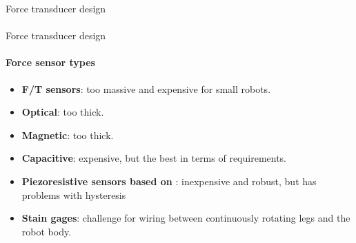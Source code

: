 \documentclass[aspectratio=169,xcolor=table]{beamer}
\begin{document}
\begin{frame}[t]{Force transducer design}
    \framesubtitle{}
\end{frame}

\begin{frame}[t]{Force transducer design}
    \framesubtitle{Force sensor types}
    \vspace{-20pt}
    \begin{multicols}{2}
        \begin{itemize}
            \item  \textbf{F/T sensors}: too massive and expensive for small robots.
            \item \textbf{Optical}: too thick.
            \item \textbf{Magnetic}: too thick.
            \item \textbf{Capacitive}: expensive, but the best in terms of requirements.
            \item {\color{black}\textbf{Piezoresistive sensors
                      based on }: inexpensive and robust, but has problems with hysteresis}

            \item {  \textbf{Stain gages}: challenge for wiring between continuously rotating legs and the robot body.}
        \end{itemize}
    \end{multicols}
    \vspace{-10pt}
\end{frame}
\end{document}
